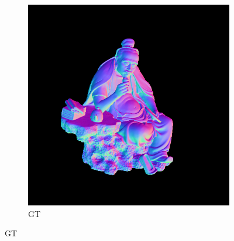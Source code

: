\begin{figure}[th]
\begin{subfigure}[b]{0.48\linewidth}
		\includegraphics[width=\linewidth]{./Figures/comparison_512/fancy_eval_11_groundtruth.png}
		\caption{GT}
	\end{subfigure}
	

\end{figure}
